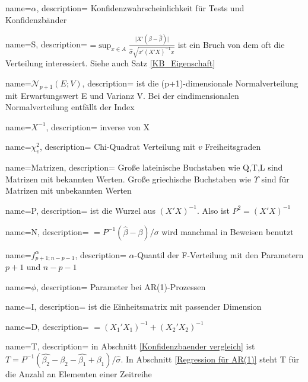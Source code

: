 
{
    name=$\alpha$,
    description={ Konfidenzwahrscheinlichkeit für Tests und Konfidenzbänder}
}  
 
{
    name=S,
    description={ =$\sup_{x\in A} \frac{\vert X'(\beta-\hat{\beta}) \vert}{\hat{\sigma} \sqrt{x'(X'X)^{-1}x}}$ ist ein Bruch von dem oft die Verteilung interessiert. Siehe auch Satz \ref{KB_Eigenschaft}}
}  

{
    name=$\mathscr{N}_{p+1}(E;V)$,
    description={ ist die (p+1)-dimensionale Normalverteilung mit Erwartungswert E und Varianz V. Bei der eindimensionalen Normalverteilung entfällt der Index}
} 

{
    name=$X^{-1}$,
    description={ inverse von X}
} 
 
{
    name=$\chi_v^2$,
    description={ Chi-Quadrat Verteilung mit $v$ Freiheitsgraden}
}  
 
{
    name=Matrizen,
    description={ Große lateinische Buchstaben wie Q,T,L sind Matrizen mit bekannten Werten. Große griechische Buchstaben wie $\Upsilon$ sind für Matrizen mit unbekannten Werten}
}  
 
{
    name=P,
    description={ ist die Wurzel aus $(X'X)^{-1}$. Also ist $P^2=(X'X)^{-1}$}
}  

{
    name=N,
    description={ $=P^{-1}(\hat{\beta}-\beta)/\sigma$ wird manchmal in Beweisen benutzt}
} 
 
{
    name=$f^{\alpha}_{p+1;n-p-1}$,
    description={ $\alpha$-Quantil der F-Verteilung mit den Parametern $p+1$ und $n-p-1$}
} 

{
    name=$\phi$,
    description={ Parameter bei AR(1)-Prozessen}
} 

{
    name=I,
    description={ ist die Einheitsmatrix mit passender Dimension}
} 

{
    name=D,
    description={ $=(X_1'X_1)^{-1}+(X_2'X_2)^{-1}$}
} 

{
    name=T,
    description={ in Abschnitt \ref{Konfidenzbaender vergleich} ist $T=P^{-1}(\hat{\beta_2}-\beta_2-\hat{\beta_1}+\beta_1)/\hat{\sigma}$. In Abschnitt \ref{Regression für AR(1)} steht T für die Anzahl an Elementen einer Zeitreihe}
} 

